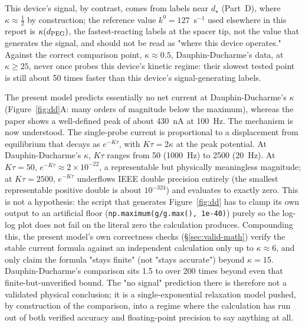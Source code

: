 \documentclass[10pt,a4paper]{article}
\numberwithin{equation}{section}
\newcommand{\kzero}{k^0}
\newcommand{\figref}[1]{Figure~\ref{#1}}
\begin{document}
This device's signal, by contrast, comes from labels near $d_\star$ (Part~D), where $\kappa\approx\tfrac12$
by construction; the reference value $\kzero=127$~s$^{-1}$ used elsewhere in this report is $\kappa(d_{\rm
PEG})$, the fastest-reacting labels at the spacer tip, not the value that generates the signal, and should
not be read as "where this device operates." Against the correct comparison point, $\kappa\approx0.5$,
Dauphin-Ducharme's data, at $\kappa\geq25$, never once probes this device's kinetic regime: their slowest
tested point is still about 50 times faster than this device's signal-generating labels.

The present model predicts essentially no net current at Dauphin-Ducharme's $\kappa$
(\figref{fig:dd}A: many orders of magnitude below the maximum), whereas the paper shows a well-defined peak
of about 430~nA at 100~Hz. The mechanism is now understood. The single-probe current is proportional to a
displacement from equilibrium that decays as $e^{-K\tau}$, with $K\tau=2\kappa$ at the peak potential. At
Dauphin-Ducharme's $\kappa$, $K\tau$ ranges from 50 (1000~Hz) to 2500 (20~Hz). At $K\tau=50$, $e^{-K\tau}\approx2\times10^{-22}$,
a representable but physically meaningless magnitude; at $K\tau=2500$, $e^{-K\tau}$ underflows IEEE double
precision entirely (the smallest representable positive double is about $10^{-324}$) and evaluates to
exactly zero. This is not a hypothesis: the script that generates \figref{fig:dd} has to clamp its own
output to an artificial floor (\texttt{np.maximum(g/g.max(), 1e-40)}) purely so the log-log plot does not
fail on the literal zero the calculation produces. Compounding this, the present model's own correctness
checks (\S\ref{sec:valid-math}) verify the stable current formula against an independent calculation only
up to $\kappa\approx6$, and only claim the formula "stays finite" (not "stays accurate") beyond $\kappa=15$.
Dauphin-Ducharme's comparison sits 1.5 to over 200 times beyond even that finite-but-unverified bound. The
"no signal" prediction there is therefore not a validated physical conclusion; it is a single-exponential
relaxation model pushed, by construction of the comparison, into a regime where the calculation has run out
of both verified accuracy and floating-point precision to say anything at all.
\end{document}
